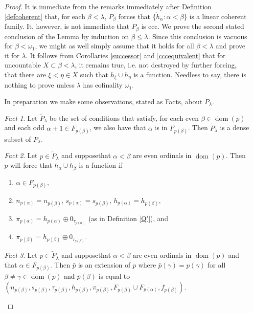 \documentclass{amsart}
\theoremstyle{definition}
\theoremstyle{remark}
\newtheorem{Fact}{Fact}
\def\dom{\operatorname{dom}}
\begin{document}
  \begin{proof}  It is immediate from the remarks immediately 
  after Definition \ref{defcoherent} that, for each $\beta <\lambda$,
   $P_\beta$ forces that $\{ \dot h_\alpha : \alpha < \beta\}$ is
    a linear coherent family. It, however, is not immediate
    that $P_\beta$ is ccc. We prove the second stated conclusion   
    of the Lemma by induction on $\beta \leq \lambda$. 
Since this conclusion is vacuous for $\beta < \omega_1$, we
might as well simply assume that it holds for all $\beta < \lambda$
and prove it for $\lambda$.  
It follows from Corollaries \ref{successor} and \ref{cccequivalent}
that for uncountable $X\subset \beta <\lambda$, it remains
true, i.e. not destroyed by further forcing,
that there are $\xi<\eta\in X$ such that
 $h_\xi\cup h_\eta$ is a function.
Needless to say, there is nothing to 
prove unless $\lambda$ has cofinality $\omega_1$. 

In preparation we make some observations, stated as Facts, about $P_\lambda$.

\begin{Fact} Let $ \tilde P_\lambda$ be the set of conditions that satisfy, for each
even $\beta\in \dom(p)$ and each odd $\alpha+1\in F_{p(\beta)}$,
 we also have that $\alpha$ is in $F_{p(\beta)}$.  Then
  $\tilde P_\lambda$ is a dense subset of $P_\lambda$.
\end{Fact}

 

\begin{Fact} Let   $p\in \tilde P_\lambda$ and suppose\label{fullfour}
that $\alpha <\beta$ are even ordinals in $\dom(p)$. Then $p$ will force
that $\dot h_\alpha\cup \dot h_\beta$ is a function if
\begin{enumerate}
\item $\alpha \in F_{p(\beta)}$,
\item $n_{p(\alpha)} = n_{p(\beta)}$, $s_{p(\alpha)} = s_{p(\beta)}$,
   $h_{p(\alpha)} = h_{p(\beta)}$,
   \item $\pi_{p(\alpha)} = h_{p(\alpha)} \oplus 0_{\tau_{p(\alpha)}}$ (as in Definition \ref{Q'}), and
   \item $\pi_{p(\beta)} = h_{p(\beta)} \oplus 0_{\tau_{p(\beta)}}$.
\end{enumerate}
\end{Fact}


\begin{Fact} Let   $p\in \tilde P_\lambda$ and suppose\label{addF}
that $\alpha <\beta$ are even ordinals in $\dom(p)$ and
that $\alpha\in F_{p(\beta)}$. Then $\bar p$ is an extension of $p$
where $\bar p(\gamma) = p(\gamma)$ for all $\beta\neq\gamma\in \dom(p)$
and 
 $\bar p(\beta)$ is equal to
 $
 ( n_{p(\beta)}, s_{p(\beta)}, \tau_{p(\beta)}, 
  h_{p(\beta)}, 
     \pi_{p(\beta)},   F_{p(\beta)}\cup F_{p(\alpha)}, \dot f_{p(\beta)})$.
\end{Fact}


\end{proof}
\end{document}
